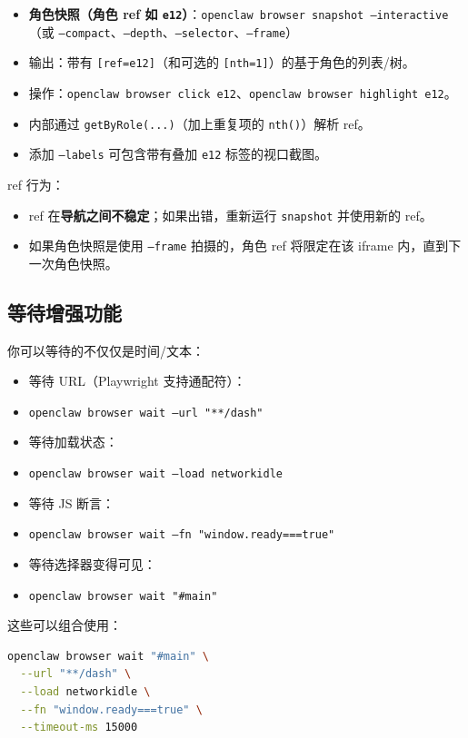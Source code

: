 \begin{itemize}
  \item \textbf{角色快照（角色 ref 如 \texttt{e12}）}：\texttt{openclaw browser snapshot --interactive}（或 \texttt{--compact}、\texttt{--depth}、\texttt{--selector}、\texttt{--frame}）
  \item 输出：带有 \texttt{[ref=e12]}（和可选的 \texttt{[nth=1]}）的基于角色的列表/树。
  \item 操作：\texttt{openclaw browser click e12}、\texttt{openclaw browser highlight e12}。
  \item 内部通过 \texttt{getByRole(...)}（加上重复项的 \texttt{nth()}）解析 ref。
  \item 添加 \texttt{--labels} 可包含带有叠加 \texttt{e12} 标签的视口截图。
\end{itemize}


ref 行为：

\begin{itemize}
  \item ref 在\textbf{导航之间不稳定}；如果出错，重新运行 \texttt{snapshot} 并使用新的 ref。
  \item 如果角色快照是使用 \texttt{--frame} 拍摄的，角色 ref 将限定在该 iframe 内，直到下一次角色快照。
\end{itemize}


\subsection{等待增强功能}


你可以等待的不仅仅是时间/文本：

\begin{itemize}
  \item 等待 URL（Playwright 支持通配符）：
  \item \texttt{openclaw browser wait --url "**/dash"}
  \item 等待加载状态：
  \item \texttt{openclaw browser wait --load networkidle}
  \item 等待 JS 断言：
  \item \texttt{openclaw browser wait --fn "window.ready===true"}
  \item 等待选择器变得可见：
  \item \texttt{openclaw browser wait "\#main"}
\end{itemize}


这些可以组合使用：

\begin{lstlisting}[language=bash]
openclaw browser wait "#main" \
  --url "**/dash" \
  --load networkidle \
  --fn "window.ready===true" \
  --timeout-ms 15000
\end{lstlisting}


